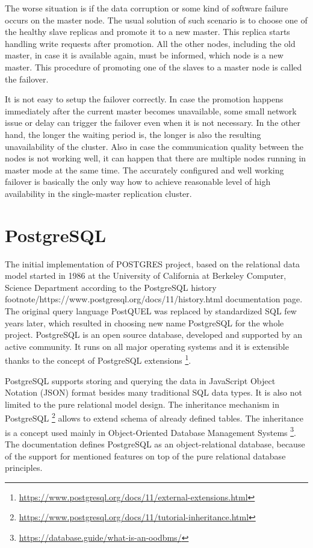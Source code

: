 \documentclass[
  digital, %
  twoside, %
  table,   %
  lof,     %
  lot,     %
]{fithesis3}
\begin{document}
The worse situation is if the data corruption or some kind of software failure occurs on the master node. The usual solution of such scenario is to choose one of the healthy slave replicas and promote it to a new master. This replica starts handling write requests after promotion. All the other nodes, including the old master, in case it is available again, must be informed, which node is a new master. This procedure of promoting one of the slaves to a master node is called the failover.

It is not easy to setup the failover correctly. In case the promotion happens immediately after the current master becomes unavailable, some small network issue or delay can trigger the failover even when it is not necessary. In the other hand, the longer the waiting period is, the longer is also the resulting unavailability of the cluster. Also in case the communication quality between the nodes is not working well, it can happen that there are multiple nodes running in master mode at the same time. The accurately configured and well working failover is basically the only way how to achieve reasonable level of high availability in the single-master replication cluster.

\section{PostgreSQL} \label{sec:postgresql}
The initial implementation of POSTGRES project, based on the relational data model started in 1986 at the University of California at Berkeley Computer, Science Department according to the PostgreSQL history footnote{/https://www.postgresql.org/docs/11/history.html} documentation page. The original query language PostQUEL was replaced by standardized SQL few years later, which resulted in choosing new name PostgreSQL for the whole project. PostgreSQL is an open source database, developed and supported by an active community. It runs on all major operating systems and it is extensible thanks to the concept of PostgreSQL extensions \footnote{\url{https://www.postgresql.org/docs/11/external-extensions.html}}.

PostgreSQL supports storing and querying the data in JavaScript Object Notation (JSON) format besides many traditional SQL data types. It is also not limited to the pure relational model design. The inheritance mechanism in PostgreSQL \footnote{\url{https://www.postgresql.org/docs/11/tutorial-inheritance.html}} allows to extend schema of already defined tables. The inheritance is a concept used mainly in Object-Oriented Database Management Systems \footnote{\url{https://database.guide/what-is-an-oodbms/}}. The documentation defines PostgreSQL as an object-relational database, because of the support for mentioned features on top of the pure relational database principles.
\end{document}
